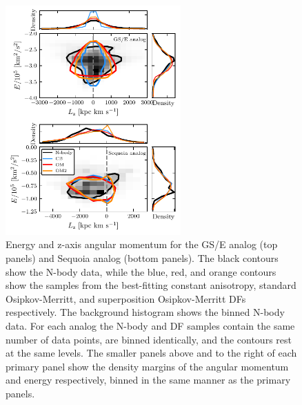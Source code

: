 \begin{figure}
    \centering
    \includegraphics[width=0.6\textwidth]{figure/ch4/energy_Lz.pdf}
    \caption{Energy and z-axis angular momentum for the GS/E analog (top panels) and Sequoia analog (bottom panels). The black contours show the N-body data, while the blue, red, and orange contours show the samples from the best-fitting constant anisotropy, standard Osipkov-Merritt, and superposition Osipkov-Merritt DFs respectively. The background histogram shows the binned N-body data. For each analog the N-body and DF samples contain the same number of data points, are binned identically, and the contours rest at the same levels. The smaller panels above and to the right of each primary panel show the density margins of the angular momentum and energy respectively, binned in the same manner as the primary panels.}
    \label{ch4:fig:case_study_ELz}
\end{figure}

